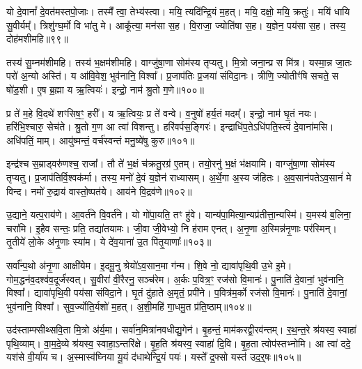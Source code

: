यो दे॒वानां᳚ दे॒वत॑मस्तपो॒जाः।
तस्मै᳚ त्वा॒ तेभ्य॑स्त्वा।
मयि॒ त्यदि॑न्द्रि॒यं म॒हत्।
मयि॒ दक्षो॒ मयि॒ क्रतुः॑।
मयि॑ धायि सु॒वीर्यम्᳚।
त्रिशु॑ग्घ॒र्मो वि भा॑तु मे।
आकू᳚त्या॒ मन॑सा स॒ह।
वि॒राजा॒ ज्योति॑षा स॒ह।
य॒ज्ञेन॒ पय॑सा स॒ह।
तस्य॒ दोह॑मशीमहि॥९९॥\ip

तस्य॑ सु॒म्नम॑शीमहि।
तस्य॑ भ॒क्षम॑शीमहि।
वाग्जु॑षा॒णा सोम॑स्य तृप्यतु।
मि॒त्रो जना॒न्प्र स मि॑त्र।
यस्मा॒न्न जा॒तः परो॑ अ॒न्यो अस्ति॑।
य आ॑वि॒वेश॒ भुव॑नानि॒ विश्वा᳚।
प्र॒जा\-प॑तिः प्र॒जया॑ संविदा॒नः।
त्रीणि॒ ज्योतीꣳ॑षि सचते॒ स षो॑ड॒शी।
ए॒ष ब्र॒ह्मा य ऋ॒त्वियः॑।
इन्द्रो॒ नाम॑ श्रु॒तो ग॒णे॥१००॥\ip

प्र ते॑ म॒हे वि॒दथे॑ शꣳसिष॒ꣳ॒ हरी᳚।
य ऋ॒त्वियः॒ प्र ते॑ वन्वे।
व॒नुषो॑ हर्य॒तं मदम्᳚।
इन्द्रो॒ नाम॑ घृ॒तं नयः।
हरि॑भि॒श्चारु॒ सेच॑ते।
श्रु॒तो ग॒ण आ त्वा॑ विशन्तु।
हरि॑वर्पस॒ङ्गिरः॑।
इन्द्राधि॑प॒ते\-ऽधि॑पति॒स्त्वं दे॒वाना॑मसि।
अधि॑पतिं॒ माम्।
आयु॑ष्मन्तं॒ वर्च॑स्वन्तं मनु॒ष्ये॑षु कुरु॥१०१॥\ip

इन्द्र॑श्च स॒म्राड्वरु॑णश्च॒ राजा᳚।
तौ ते॑ भ॒क्षं च॑क्रतु॒रग्र॑ ए॒तम्।
तयो॒रनु॑\- भ॒क्षं भ॑क्षयामि।
वाग्जु॑षा॒णा सोम॑स्य तृप्यतु।
प्र॒जा\-प॑तिर्वि॒श्वक॑र्मा।
तस्य॒ मनो॑ दे॒वं य॒ज्ञेन॑ राध्यासम्।
अ॒र्थे॒गा अ॒स्य ज॑हितः।
अ॒व॒सान॑पते\-ऽव॒सानं॑ मे विन्द।
नमो॑ रु॒द्राय॑ वास्तो॒ष्पत॑ये।
आय॑ने वि॒द्रव॑णे॥१०२॥\ip

उ॒द्याने॒ यत्प॒राय॑णे।
आ॒वर्त॑ने वि॒वर्त॑ने।
यो गो॑पा॒यति॒ तꣳ हु॑वे।
यान्य॑पा॒मित्या॒न्य\-प्र॑तीत्ता॒\-न्यस्मि॑।
य॒मस्य॑ ब॒लिना॒ चरा॑मि।
इ॒हैव सन्तः॒ प्रति॒ तद्या॑तयामः।
जी॒वा जी॒वेभ्यो॒ नि ह॑राम एनत्।
अ॒नृ॒णा अ॒स्मिन्न॑नृ॒णाः पर॑स्मिन्।
तृ॒तीये॑ लो॒के अ॑नृ॒णाः स्या॑म।
ये दे॑व॒याना॑ उ॒त पि॑तृ॒याणाः᳚॥१०३॥\ip

सर्वा᳚न्प॒थो अ॑नृ॒णा आक्षी॑येम।
इ॒दमू॒नु श्रेयो॑\-ऽव॒सान॒मा ग॑न्म।
शि॒वे नो॒ द्यावा॑पृथि॒वी उ॒भे इ॒मे।
गोम॒द्धन॑व॒दश्व॑व॒दूर्ज॑स्वत्।
सु॒वीरा॑ वी॒रैरनु॒\- सञ्च॑रेम।
अ॒र्कः प॒वित्र॒ꣳ॒ रज॑सो वि॒मानः॑।
पु॒नाति॑ दे॒वानां॒ भुव॑नानि॒ विश्वा᳚।
द्यावा॑पृथि॒वी पय॑सा संविदा॒ने।
घृ॒तं दु॑हाते अ॒मृतं॒ प्रपी॑ने।
प॒वित्र॑म॒र्को रज॑सो वि॒मानः॑।
पु॒नाति॑ दे॒वानां॒ भुव॑नानि॒ विश्वा᳚।
सुव॒र्ज्योति॒र्यशो॑ म॒हत्।
अ॒शी॒महि॑ गा॒धमु॒त प्र॑ति॒ष्ठाम्॥१०४॥\ip\anuvakamend[चा॒त॒य॒त॒ श्री॒णी॒ता॒ꣳ॒ स॒त्यमा॒हुर॑शीमहि ग॒णे कु॑रु वि॒द्रव॑णे पितृ॒याणा॑ अ॒र्को रज॑सो वि॒मान॒स्त्रीणि॑ च]

उद॑स्ताम्फ्सीथ्सवि॒ता मि॒त्रो अ॑र्य॒मा।
सर्वा॑न॒मित्रा॑न\-वधीद्यु॒गेन॑।
बृ॒हन्तं॒ माम॑करद्वी॒र\-व॑न्तम्।
र॒थ॒न्त॒रे श्र॑यस्व॒ स्वाहा॑ पृथि॒व्याम्।
वा॒म॒दे॒व्ये श्र॑यस्व॒ स्वाहा॒\-ऽन्तरि॑क्षे।
बृ॒ह॒ति श्र॑यस्व॒ स्वाहा॑ दि॒वि।
बृ॒ह॒ता त्वोप॑स्तभ्नोमि।
आ त्वा॑ ददे॒ यश॑से वी॒र्या॑य च।
अ॒स्मास्व॑घ्निया यू॒यं द॑धाथेन्द्रि॒यं पयः॑।
यस्ते᳚ द्र॒फ्सो यस्त॑ उद॒र्॒षः॥१०५॥\ip

